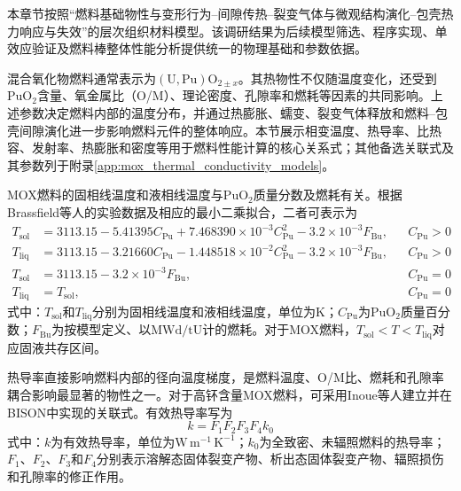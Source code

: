 本章节按照“燃料基础物性与变形行为--间隙传热--裂变气体与微观结构演化--包壳热力响应与失效”的层次组织材料模型。该调研结果为后续模型筛选、程序实现、单效应验证及燃料棒整体性能分析提供统一的物理基础和参数依据。

\label{sec:mox_thermophysical_properties}

混合氧化物燃料通常表示为$(\mathrm{U},\mathrm{Pu})\mathrm{O}_{2\pm x}$。其热物性不仅随温度变化，还受到$\mathrm{PuO}_2$含量、氧金属比（O/M）、理论密度、孔隙率和燃耗等因素的共同影响。上述参数决定燃料内部的温度分布，并通过热膨胀、蠕变、裂变气体释放和燃料--包壳间隙演化进一步影响燃料元件的整体响应。本节展示相变温度、热导率、比热容、发射率、热膨胀和密度等用于燃料性能计算的核心关系式；其他备选关联式及其参数列于附录\ref{app:mox_thermal_conductivity_models}。


MOX燃料的固相线温度和液相线温度与$\mathrm{PuO}_2$质量分数及燃耗有关。根据Brassfield等人的实验数据及相应的最小二乘拟合，二者可表示为
\begin{subequations}\label{eq:mox_phase_transition_temperature}
	\begin{align}
		T_{\mathrm{sol}}
		&=3113.15-5.41395C_{\mathrm{Pu}}
		+7.468390\times10^{-3}C_{\mathrm{Pu}}^{2}
		-3.2\times10^{-3}F_{\mathrm{Bu}},
		&& C_{\mathrm{Pu}}>0\label{eq:mox_solidus_with_pu}\\
		T_{\mathrm{liq}}
		&=3113.15-3.21660C_{\mathrm{Pu}}
		-1.448518\times10^{-2}C_{\mathrm{Pu}}^{2}
		-3.2\times10^{-3}F_{\mathrm{Bu}},
		&& C_{\mathrm{Pu}}>0\label{eq:mox_liquidus_with_pu}\\
		T_{\mathrm{sol}}
		&=3113.15-3.2\times10^{-3}F_{\mathrm{Bu}},
		&& C_{\mathrm{Pu}}=0\label{eq:uo2_solidus}\\
		T_{\mathrm{liq}}&=T_{\mathrm{sol}},
		&& C_{\mathrm{Pu}}=0\label{eq:uo2_liquidus}
	\end{align}
\end{subequations}
式中：$T_{\mathrm{sol}}$和$T_{\mathrm{liq}}$分别为固相线温度和液相线温度，单位为K；$C_{\mathrm{Pu}}$为$\mathrm{PuO}_2$质量百分数；$F_{\mathrm{Bu}}$为按模型定义、以$\mathrm{MWd/tU}$计的燃耗。对于MOX燃料，$T_{\mathrm{sol}}<T<T_{\mathrm{liq}}$对应固液共存区间。


热导率直接影响燃料内部的径向温度梯度，是燃料温度、O/M比、燃耗和孔隙率耦合影响最显著的物性之一。对于高钚含量MOX燃料，可采用Inoue等人建立并在BISON中实现的关联式\cite{inoueThermalConductivityUranium2000,halesBISONTheoryManual2016}。有效热导率写为
\begin{equation}
	k=F_1F_2F_3F_4k_0
	\label{eq:fast_mox_thermal_conductivity}
\end{equation}
式中：$k$为有效热导率，单位为$\mathrm{W\,m^{-1}\,K^{-1}}$；$k_0$为全致密、未辐照燃料的热导率；$F_1$、$F_2$、$F_3$和$F_4$分别表示溶解态固体裂变产物、析出态固体裂变产物、辐照损伤和孔隙率的修正作用。

